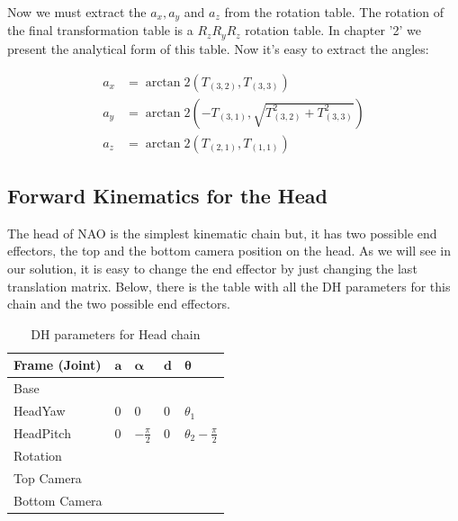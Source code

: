 Now we must extract the \(a_x,a_y\) and \(a_z\) from the rotation table. The rotation of the final transformation table is a \(R_zR_yR_z\) rotation table. In chapter '2' we present the analytical form of this table. Now it's easy to extract the angles:
\begin{small}
\begin{align*}
a_x &= \arctan2\left(T_{(3,2)},T_{(3,3)}\right)\\
a_y &= \arctan2\left(-T_{(3,1)},\sqrt{T^2_{(3,2)} + T^2_{(3,3)}}\right)\\
a_z &= \arctan2\left(T_{(2,1)},T_{(1,1)}\right)
\end{align*}
\end{small}

\subsection{Forward Kinematics for the Head}
The head of NAO is the simplest kinematic chain but, it has two possible end effectors, the top and the bottom camera position on the head. As we will see in our solution, it is easy to change the end effector by just changing the last translation matrix. Below, there is the table with all the DH parameters for this chain and the two possible end effectors. \\
\begin{table}[h]
\centering
\begin{tabular}{|l|>{\centering\arraybackslash}m{2.55cm}|>{\centering\arraybackslash}m{2.55cm}|>{\centering\arraybackslash}m{2.55cm}|>{\centering\arraybackslash}m{2.55cm}|}
\hline
\textbf{Frame (Joint)} & \(\mathbf{a}\) & \(\boldsymbol{\alpha}\) & \(\mathbf{d}\) & \(\boldsymbol{\theta}\)\\ \hline
Base & \multicolumn{4}{c|}{\(A(0,0,\text{\footnotesize{NeckOffsetZ}})\)} \\ \hline
HeadYaw & \(0\) & \(0\) & \(0\) & \(\theta_1\) \\ \hline
HeadPitch & \(0\) & \(-\frac{\pi}{2}\) & \(0\) & \(\theta_2 - \frac{\pi}{2}\) \\ \hline
Rotation & \multicolumn{4}{c|}{\(R_x(\frac{\pi}{2})R_y(\frac{\pi}{2})\)} \\ \hline
Top Camera & \multicolumn{4}{c|}{\(A(\text{\footnotesize{topCameraX}},0,\text{\footnotesize{topCameraZ}})\)} \\ \hline
Bottom Camera & \multicolumn{4}{c|}{\(A(\text{\footnotesize{bottomCameraX}},0,\text{\footnotesize{bottomCameraZ}})\)} \\ \hline
\end{tabular}
\caption{DH parameters for Head chain}
\label{tab:DH parameters for Head chain}
\end{table}


